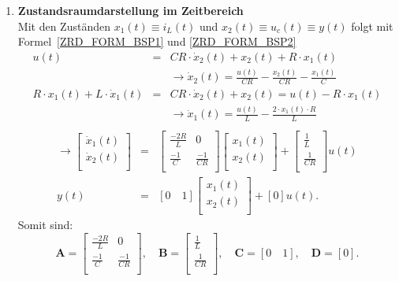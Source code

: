 {\begin{enumerate}
\item[]{\bf Zustandsraumdarstellung im
    Zeitbereich}\\ Mit den
  Zust\"anden $x_1(t)\equiv i_L(t)$ und $x_2(t)\equiv u_c(t)\equiv
  y(t)$ folgt mit Formel~\ref{ZRD_FORM_BSP1} und \ref{ZRD_FORM_BSP2}
\begin{eqnarray*}
 u(t) &=& CR\cdot\dot{x}_2(t)+x_2(t)+R\cdot x_1(t)\\
 & & \rightarrow \dot{x}_2(t)=\frac{u(t)}{CR}-\frac{x_2(t)}{CR}-\frac{x_1(t)}{C} \\
R\cdot x_1(t) +L\cdot\dot{x}_1(t)&=& CR\cdot\dot{x}_2(t)+x_2(t) = u(t)-R\cdot x_1(t)\\
 & & \rightarrow \dot{x}_1(t)=\frac{u(t)}{L}-\frac{2\cdot x_1(t)\cdot R}{L} \\
\end{eqnarray*}
\begin{eqnarray*}
\rightarrow \left [
\begin{array}{c}
 \dot{x}_1(t) \\
 \dot{x}_2(t) \\
\end{array}
\right ]&=&
\left [
\begin{array}{cc}
 \frac{-2R}{L} & 0\\
\frac{-1}{C} & \frac{-1}{CR}\\
\end{array}
\right ]
\left [
\begin{array}{c}
 x_1(t) \\
 x_2(t) \\
\end{array}
\right ]
+
\left [
\begin{array}{c}
 \frac{1}{L} \\
 \frac{1}{CR} \\
\end{array}
\right ]u(t)\\
y(t)&=&[0 \quad 1]
\left [
\begin{array}{c}
 x_1(t) \\
 x_2(t) \\
\end{array}
\right ]
+[0] u(t).
\end{eqnarray*}
Somit sind:
\begin{equation*}
\boldsymbol{A}=\left [
\begin{array}{cc}
 \frac{-2R}{L} & 0\\
\frac{-1}{C} & \frac{-1}{CR}\\
\end{array}
\right ],\quad
\boldsymbol{B}=\left [
 \begin{array}{c}
  \frac{1}{L} \\
 \frac{1}{CR} \\
\end{array}
\right ],\quad \boldsymbol{C}=[ 0 \quad 1], \quad \boldsymbol{D}=[0]. 
\end{equation*}



\end{enumerate}}
